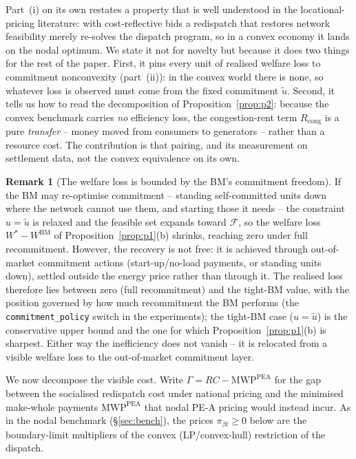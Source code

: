 \documentclass[review,3p,times]{elsarticle}
\theoremstyle{plain}
\theoremstyle{definition}
\newtheorem{remark}{Remark}
\begin{document}
Part~(i) on its own restates a property that is well understood in the
locational-pricing literature: with cost-reflective bids a redispatch that
restores network feasibility merely re-solves the dispatch program, so in a convex
economy it lands on the nodal optimum. We state it not for novelty but because it
does two things for the rest of the paper. First, it pins every unit of realised
welfare loss to commitment nonconvexity (part~(ii)): in the convex world there is
none, so whatever loss is observed must come from the fixed commitment $\tilde u$.
Second, it tells us how to read the decomposition of Proposition~\ref{prop:p2}:
because the convex benchmark carries \emph{no} efficiency loss, the congestion-rent
term $R_{\mathrm{cong}}$ is a pure \emph{transfer} -- money moved from consumers to
generators -- rather than a resource cost. The contribution is that pairing, and
its measurement on settlement data, not the convex equivalence on its own.

\begin{remark}[The welfare loss is bounded by the BM's commitment freedom]
\label{rem:recommit}
If the BM may re-optimise commitment -- standing self-committed units down where
the network cannot use them, and starting those it needs -- the constraint
$u=\tilde u$ is relaxed and the feasible set expands toward $\mathcal F$, so the
welfare loss $W^\ast-W^{\mathrm{BM}}$ of Proposition~\ref{prop:p1}(b) shrinks,
reaching zero under full recommitment. However, the recovery is not free: it is achieved
through out-of-market commitment actions (start-up/no-load payments, or standing
units down), settled outside the energy price rather than through it. The
realised loss therefore lies between zero (full recommitment) and the tight-BM
value, with the position governed by how much recommitment the BM performs (the
\texttt{commitment\_policy} switch in the experiments); the tight-BM case
($u=\tilde u$) is the conservative upper bound and the one for which
Proposition~\ref{prop:p1}(b) is sharpest. Either way the inefficiency does not
vanish -- it is relocated from a visible welfare loss to the out-of-market
commitment layer.
\end{remark}

We now decompose the visible cost. Write $\Gamma=RC-\mathrm{MWP}^{\mathrm{PEA}}$
for the gap between the socialised redispatch cost under national pricing and the
minimised make-whole payments $\mathrm{MWP}^{\mathrm{PEA}}$ that nodal PE-A pricing
\citep{bichler2022} would instead incur. As in the nodal benchmark
(\S\ref{sec:bench}), the prices $\pi_{\beta t}\ge0$ below are the boundary-limit
multipliers of the convex (LP/convex-hull) restriction of the dispatch.
\end{document}
